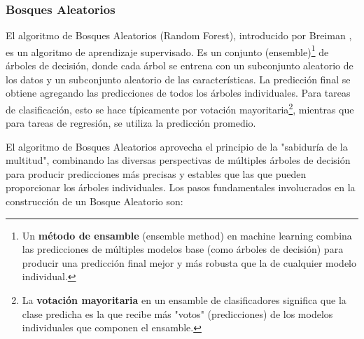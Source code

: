 \subsubsection{Bosques Aleatorios}
El algoritmo de Bosques Aleatorios (Random Forest), introducido por Breiman \cite{breiman2001random}, es un algoritmo de aprendizaje supervisado.
Es un conjunto (ensemble)\footnote{Un \textbf{método de ensamble} (ensemble method) en machine learning combina las predicciones de múltiples modelos base (como árboles de decisión) para producir una predicción final mejor y más robusta que la de cualquier modelo individual.} de árboles de decisión, donde cada árbol se entrena con un subconjunto aleatorio de los datos y un subconjunto aleatorio de las características.
La predicción final se obtiene agregando las predicciones de todos los árboles individuales.
Para tareas de clasificación, esto se hace típicamente por votación mayoritaria\footnote{La \textbf{votación mayoritaria} en un ensamble de clasificadores significa que la clase predicha es la que recibe más "votos" (predicciones) de los modelos individuales que componen el ensamble.}, mientras que para tareas de regresión, se utiliza la predicción promedio.

El algoritmo de Bosques Aleatorios aprovecha el principio de la "sabiduría de la multitud", combinando las diversas perspectivas de múltiples árboles de decisión para producir predicciones más precisas y estables que las que pueden proporcionar los árboles individuales.
Los pasos fundamentales involucrados en la construcción de un Bosque Aleatorio son:

